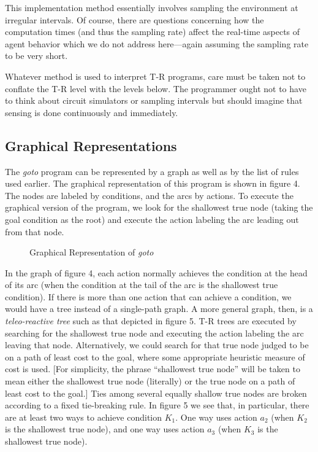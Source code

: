 This implementation method essentially involves sampling the environment at  
irregular intervals.  Of course, there are questions concerning how the  
computation times (and thus the sampling rate)  affect the real-time aspects  
of agent behavior which we do not address here---again assuming the sampling  
rate to be very short. 


Whatever method is used to interpret T-R programs, care must be taken not to  
conflate the T-R level with the levels below.  The programmer ought not to  
have to think about circuit simulators or sampling intervals but should  
imagine that sensing is done continuously and immediately. 


\subsection{Graphical Representations}

The {\it goto} program can be represented by a graph as well as by the list  
of rules used earlier.  The graphical representation of this program is shown  
in figure 4.  The nodes are labeled by conditions, and the arcs by actions.  
To execute the graphical version of the program, we look for the shallowest  
true node (taking the goal condition as the root) and execute the action  
labeling the arc leading out from that node.   


\begin{figure}[htb]
\centerline{}
\caption{Graphical Representation of  {\it goto}} 

\end{figure} 




In the graph of figure 4, each action normally achieves the condition at the  
head of its arc (when the condition at the tail of the arc is the shallowest  
true condition).  If there is more than one action that can achieve a  
condition, we would have a tree instead of a single-path graph.  A more   
general graph, then, is a {\it teleo-reactive tree} such as that depicted in  
figure 5.   T-R trees are executed by searching for the shallowest true node  
and executing the action labeling the arc leaving that node.  Alternatively,  
we could search for that true node judged to be on a path of least cost to  
the goal, where some appropriate heuristic measure of cost is used.  [For  
simplicity, the phrase ``shallowest true node'' will be taken to mean either  
the shallowest true node (literally) or the true node on a path of least cost  
to the goal.] Ties among several equally shallow true nodes are broken  
according to a fixed tie-breaking rule. In figure 5 we see that, in  
particular, there are at least two ways to achieve condition $K_1$.  One way  
uses action $a_2$ (when $K_2$ is the shallowest true node), and one way uses  
action $a_3$ (when $K_3$ is the shallowest true node).     


